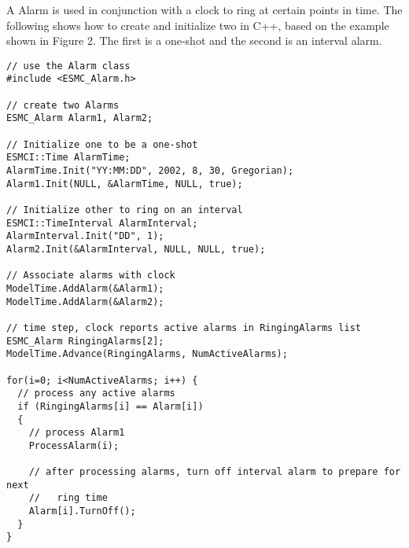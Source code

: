 
A Alarm is used in conjunction with a clock to ring at certain points in time.
The following shows how to create and initialize two in C++, based on the
example shown in Figure 2.  The first is a one-shot and the second is an
interval alarm.

\begin{verbatim}
// use the Alarm class
#include <ESMC_Alarm.h>

// create two Alarms
ESMC_Alarm Alarm1, Alarm2;

// Initialize one to be a one-shot
ESMCI::Time AlarmTime;
AlarmTime.Init("YY:MM:DD", 2002, 8, 30, Gregorian);
Alarm1.Init(NULL, &AlarmTime, NULL, true);

// Initialize other to ring on an interval
ESMCI::TimeInterval AlarmInterval;
AlarmInterval.Init("DD", 1);
Alarm2.Init(&AlarmInterval, NULL, NULL, true);

// Associate alarms with clock
ModelTime.AddAlarm(&Alarm1);
ModelTime.AddAlarm(&Alarm2);

// time step, clock reports active alarms in RingingAlarms list
ESMC_Alarm RingingAlarms[2];
ModelTime.Advance(RingingAlarms, NumActiveAlarms);

for(i=0; i<NumActiveAlarms; i++) {
  // process any active alarms
  if (RingingAlarms[i] == Alarm[i])
  {
    // process Alarm1
    ProcessAlarm(i);

    // after processing alarms, turn off interval alarm to prepare for next
    //   ring time
    Alarm[i].TurnOff();
  }
}
\end{verbatim}
